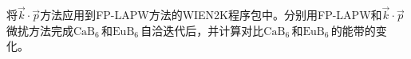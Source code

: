 将$\vec k\cdot\vec p$方法应用到\textrm{FP-LAPW}方法的\textrm{WIEN2K}程序包中。分别用\textrm{FP-LAPW}和$\vec k\cdot\vec p$\,微扰方法完成$\mathrm{CaB}_6$\,和$\mathrm{EuB}_6$\,自洽迭代后，并计算对比$\mathrm{CaB}_6$\,和$\mathrm{EuB}_6$\,的能带的变化。%
%  
%  
